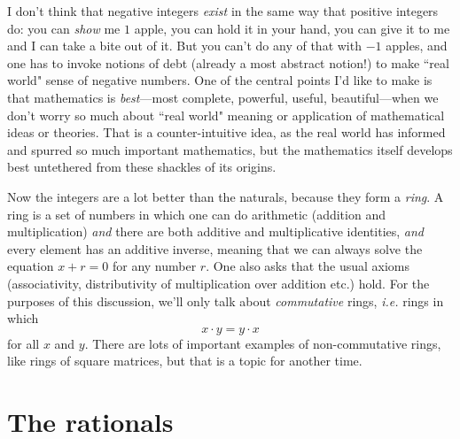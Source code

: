 \documentclass[11pt,oneside]{amsart}
\begin{document}
I don't think that negative integers {\em exist} in the same way that positive integers do: you can {\em show} me $1$ apple, you can hold it in your hand,
you can give it to me and I can take a bite out of it.  But you can't do any of that with $-1$ apples, and one has to invoke notions of debt (already a most abstract notion!) to make ``real world" sense of negative numbers. One of the central points I'd like to make is that mathematics is {\em best}---most complete, powerful, useful, beautiful---when we don't worry so much about ``real world" meaning or application of mathematical ideas or theories.  That is a counter-intuitive idea, 
as the real world has informed and spurred so much important mathematics, but the mathematics itself develops best untethered from these shackles of its origins.

Now the integers are a lot better than the naturals, because they form a {\em ring}.  A ring is a set of numbers in which one can do arithmetic
(addition and multiplication) {\em and} there are both additive and multiplicative identities, {\em and} every element has an additive inverse,
meaning that we can always solve the equation $x+r = 0$ for any number $r$.  One also asks that the usual axioms (associativity, distributivity of
multiplication over addition etc.) hold.  
For the purposes of this discussion, we'll only talk about {\em commutative} rings, 
{\em i.e.} rings in which
$$x\cdot y = y\cdot x$$
for all $x$ and $y$.  There are lots of important examples of non-commutative rings, like rings of square matrices, but that is a topic for another time.


\section{The rationals}
\end{document}
